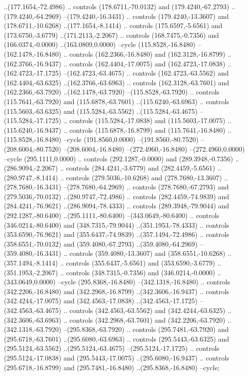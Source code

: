 \begin{scope}[shift={(55,360)}]
..(177.1654,-72.4986) .. controls (178.6711,-70.0132) and (179.4240,-67.2793) ..(179.4240,-64.2969) --(179.4240,-16.3431) .. controls (179.4240,-13.3607) and (178.6711,-10.6268) ..(177.1654,-8.1414) .. controls (175.6597,-5.6561) and (173.6750,-3.6779) ..(171.2113,-2.2067) .. controls (168.7475,-0.7356) and (166.0374,-0.0000) ..(163.0809,0.0000) --cycle (115.8528,-16.8480) --(162.1478,-16.8480) .. controls (162.2366,-16.8480) and (162.3128,-16.8799) ..(162.3766,-16.9437) .. controls (162.4404,-17.0075) and (162.4723,-17.0838) ..(162.4723,-17.1725) --(162.4723,-63.4675) .. controls (162.4723,-63.5562) and (162.4404,-63.6325) ..(162.3766,-63.6963) .. controls (162.3128,-63.7601) and (162.2366,-63.7920) ..(162.1478,-63.7920) --(115.8528,-63.7920) .. controls (115.7641,-63.7920) and (115.6878,-63.7601) ..(115.6240,-63.6963) .. controls (115.5603,-63.6325) and (115.5284,-63.5562) ..(115.5284,-63.4675) --(115.5284,-17.1725) .. controls (115.5284,-17.0838) and (115.5603,-17.0075) ..(115.6240,-16.9437) .. controls (115.6878,-16.8799) and (115.7641,-16.8480) ..(115.8528,-16.8480) --cycle (191.8560,0.0000) --(191.8560,-80.7520) --(208.6004,-80.7520) --(208.6004,-16.8480) --(272.4960,-16.8480) --(272.4960,0.0000) --cycle (295.1111,0.0000) .. controls (292.1287,-0.0000) and (289.3948,-0.7356) ..(286.9094,-2.2067) .. controls (284.4241,-3.6779) and (282.4459,-5.6561) ..(280.9747,-8.1414) .. controls (279.5036,-10.6268) and (278.7680,-13.3607) ..(278.7680,-16.3431) --(278.7680,-64.2969) .. controls (278.7680,-67.2793) and (279.5036,-70.0132) ..(280.9747,-72.4986) .. controls (282.4459,-74.9839) and (284.4241,-76.9621) ..(286.9094,-78.4333) .. controls (289.3948,-79.9044) and (292.1287,-80.6400) ..(295.1111,-80.6400) --(343.0649,-80.6400) .. controls (346.0214,-80.6400) and (348.7315,-79.9044) ..(351.1953,-78.4333) .. controls (353.6590,-76.9621) and (355.6437,-74.9839) ..(357.1494,-72.4986) .. controls (358.6551,-70.0132) and (359.4080,-67.2793) ..(359.4080,-64.2969) --(359.4080,-16.3431) .. controls (359.4080,-13.3607) and (358.6551,-10.6268) ..(357.1494,-8.1414) .. controls (355.6437,-5.6561) and (353.6590,-3.6779) ..(351.1953,-2.2067) .. controls (348.7315,-0.7356) and (346.0214,-0.0000) ..(343.0649,0.0000) --cycle (295.8368,-16.8480) --(342.1318,-16.8480) .. controls (342.2206,-16.8480) and (342.2968,-16.8799) ..(342.3606,-16.9437) .. controls (342.4244,-17.0075) and (342.4563,-17.0838) ..(342.4563,-17.1725) --(342.4563,-63.4675) .. controls (342.4563,-63.5562) and (342.4244,-63.6325) ..(342.3606,-63.6963) .. controls (342.2968,-63.7601) and (342.2206,-63.7920) ..(342.1318,-63.7920) --(295.8368,-63.7920) .. controls (295.7481,-63.7920) and (295.6718,-63.7601) ..(295.6080,-63.6963) .. controls (295.5443,-63.6325) and (295.5124,-63.5562) ..(295.5124,-63.4675) --(295.5124,-17.1725) .. controls (295.5124,-17.0838) and (295.5443,-17.0075) ..(295.6080,-16.9437) .. controls (295.6718,-16.8799) and (295.7481,-16.8480) ..(295.8368,-16.8480) --cycle;

\end{scope}
